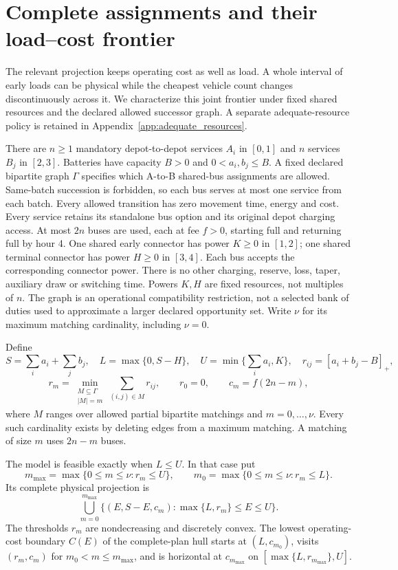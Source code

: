\section{Complete assignments and their load--cost frontier}\label{sec:heterogeneous}
The relevant projection keeps operating cost as well as load. A whole
interval of early loads can be physical while the cheapest vehicle count
changes discontinuously across it. We characterize this joint frontier
under fixed shared resources and the declared allowed successor graph.
A separate adequate-resource policy is retained in
Appendix~\ref{app:adequate_resources}.

There are $n\ge1$ mandatory depot-to-depot services $A_i$ in $[0,1]$
and $n$ services $B_j$ in $[2,3]$. Batteries have capacity $B>0$ and
$0<a_i,b_j\le B$. A fixed declared bipartite graph $\Gamma$ specifies
which A-to-B shared-bus assignments are allowed. Same-batch succession is
forbidden, so each bus serves at most one service from each batch. Every allowed transition
has zero movement time, energy and cost. Every service retains its standalone
bus option and its original depot charging access. At most $2n$ buses are used, each at fee $f>0$,
starting full and returning full by hour 4. One shared early connector
has power $K\ge0$ in $[1,2]$; one shared terminal connector has power
$H\ge0$ in $[3,4]$. Each bus accepts the corresponding connector power.
There is no other charging, reserve, loss, taper, auxiliary draw or switching
time. Powers $K,H$ are fixed resources, not multiples of $n$.
The graph is an operational compatibility restriction, not a selected bank
of duties used to approximate a larger declared opportunity set. Write
$\nu$ for its maximum matching cardinality, including $\nu=0$.

Define
\[
 S=\sum_i a_i+\sum_j b_j,\quad L=\max\{0,S-H\},\quad
 U=\min\{\sum_i a_i,K\},\quad r_{ij}=[a_i+b_j-B]_+,
\]
\[
 r_m=\min_{\substack{M\subseteq\Gamma\\|M|=m}}\sum_{(i,j)\in M}r_{ij},\qquad
 r_0=0,\qquad c_m=f(2n-m),
\]
where $M$ ranges over allowed partial bipartite matchings and
$m=0,\ldots,\nu$. Every such cardinality exists by deleting edges from
a maximum matching. A matching of size $m$ uses $2n-m$ buses.

\begin{theorem}\label{thm:sharedprojection}
The model is feasible exactly when $L\le U$. In that case put
\[
 m_{\max}=\max\{0\le m\le\nu:r_m\le U\},\qquad
 m_0=\max\{0\le m\le\nu:r_m\le L\}.
\]
Its complete physical projection is
\begin{equation}\label{eq:sharedprojection}
 \bigcup_{m=0}^{m_{\max}}
 \{(E,S-E,c_m):\max\{L,r_m\}\le E\le U\}.
\end{equation}
The thresholds $r_m$ are nondecreasing and discretely convex. The
lowest operating-cost boundary $C(E)$ of the complete-plan hull starts
at $(L,c_{m_0})$, visits $(r_m,c_m)$ for $m_0<m\le m_{\max}$,
and is horizontal at $c_{m_{\max}}$ on
$[\max\{L,r_{m_{\max}}\},U]$.
\end{theorem}

